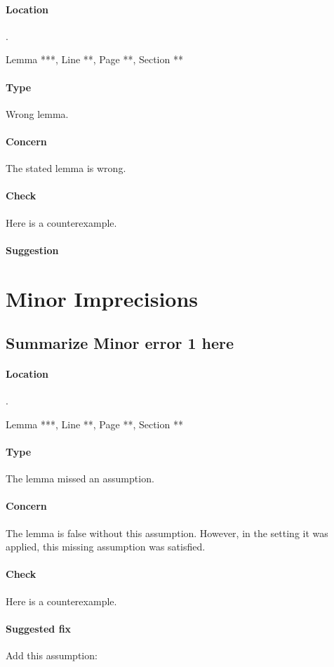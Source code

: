 \documentclass[11pt,reqno]{amsart}
\begin{document}
\paragraph{Location}.

Lemma ***, Line **, Page **, Section **

\paragraph{Type}

Wrong lemma.

\paragraph{Concern}

The stated lemma is wrong.

\paragraph{Check}

Here is a counterexample.

\paragraph{Suggestion}

\section{Minor Imprecisions}

\subsection{Summarize Minor error 1 here}

\paragraph{Location}.

Lemma ***, Line **, Page **, Section **

\paragraph{Type}

The lemma missed an assumption.

\paragraph{Concern}

The lemma is false without this assumption. However, in the setting it was applied, this missing assumption was satisfied.

\paragraph{Check}

Here is a counterexample.

\paragraph{Suggested fix}

Add this assumption: 
\end{document}
